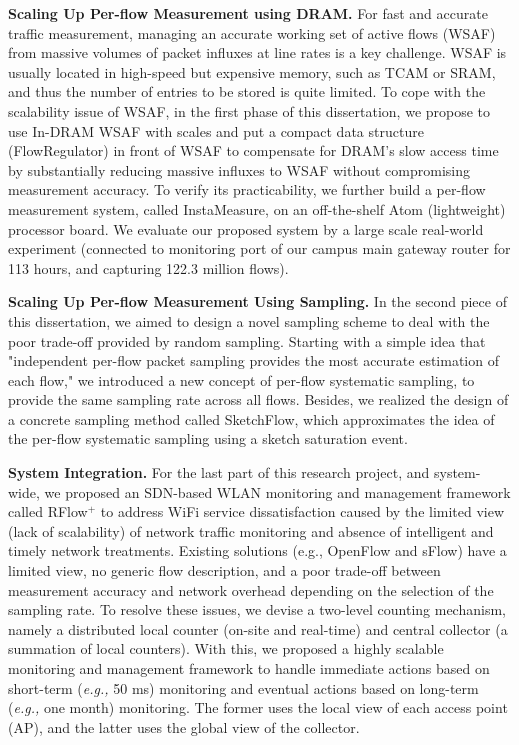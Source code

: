 \documentclass{NSF}
\newcommand{\BfPara}[1]{{\noindent\textbf{#1.}}\xspace}
\newcommand{\eg}{{\em e.g.,}\xspace}
\newcommand{\ours}{RFlow$^+$}
\newcommand{\ourIs}{InstaMeasure}
\newcommand{\ourFR}{FlowRegulator}
\begin{document}
\BfPara{Scaling Up Per-flow Measurement using DRAM} For fast and accurate traffic measurement, managing an accurate working set of active flows (WSAF) from massive volumes of packet influxes at line rates is a key challenge. WSAF is usually located in high-speed but expensive memory, such as TCAM or SRAM, and thus the number of entries to be stored is quite limited.
To cope with the scalability issue of WSAF, in the first phase of this dissertation, we propose to use In-DRAM WSAF with scales and put a compact data structure (\ourFR{}) in front of WSAF to compensate for DRAM's slow access time by substantially reducing massive influxes to WSAF without compromising measurement accuracy. 
To verify its practicability, we further build a per-flow measurement system, called \ourIs{}, on an off-the-shelf Atom (lightweight) processor board.
We evaluate our proposed system by a large scale real-world experiment (connected to monitoring port of our campus main gateway router for 113 hours, and capturing 122.3 million flows). 

\BfPara{Scaling Up Per-flow Measurement Using Sampling} In the second piece of this dissertation, we aimed to design a novel sampling scheme to deal with the poor trade-off provided by random sampling. 
Starting with a simple idea that "independent per-flow packet sampling provides the most accurate estimation of each flow," 
we introduced a new concept of per-flow systematic sampling, 
to provide the same sampling rate across all flows. 
Besides, we realized the design of a concrete sampling method called SketchFlow, which approximates the idea of the per-flow systematic sampling using a sketch saturation event.

\BfPara{System Integration} For the last part of this research project, and system-wide, we proposed an SDN-based WLAN monitoring and management framework called \ours{} to address WiFi service dissatisfaction caused by the limited view (lack of scalability) of network traffic monitoring and absence of intelligent and timely network treatments.
Existing solutions (e.g., OpenFlow and sFlow) have a limited view, no generic flow description, and a poor trade-off between measurement accuracy and network overhead depending on the selection of the sampling rate.
To resolve these issues, we devise a two-level counting mechanism, namely a distributed local counter (on-site and real-time) and central collector (a summation of local counters). With this, we proposed a highly scalable monitoring and management framework to handle immediate actions based on short-term (\eg 50 ms) monitoring and eventual actions based on long-term (\eg one month) monitoring. 
The former uses the local view of each access point (AP), and the latter uses the global view of the collector. 
\end{document}
